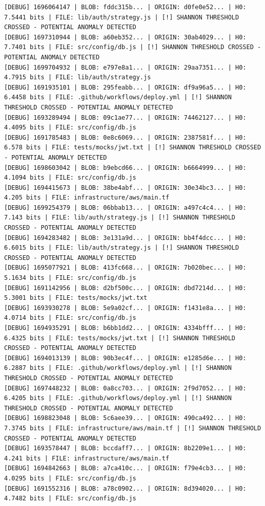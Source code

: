 \documentclass[12pt, a4paper, oneside]{report}
\begin{document}
\begin{lstlisting}[basicstyle=\tiny\ttfamily]
[DEBUG] 1696064147 | BLOB: fddc315b... | ORIGIN: d0fe0e52... | H0: 7.5441 bits | FILE: lib/auth/strategy.js | [!] SHANNON THRESHOLD CROSSED - POTENTIAL ANOMALY DETECTED
[DEBUG] 1697310944 | BLOB: a60eb352... | ORIGIN: 30ab4029... | H0: 7.7401 bits | FILE: src/config/db.js | [!] SHANNON THRESHOLD CROSSED - POTENTIAL ANOMALY DETECTED
[DEBUG] 1699704932 | BLOB: e797e8a1... | ORIGIN: 29aa7351... | H0: 4.7915 bits | FILE: lib/auth/strategy.js
[DEBUG] 1691935101 | BLOB: 295feabb... | ORIGIN: df9a96a5... | H0: 6.4458 bits | FILE: .github/workflows/deploy.yml | [!] SHANNON THRESHOLD CROSSED - POTENTIAL ANOMALY DETECTED
[DEBUG] 1693289494 | BLOB: 09c1ae77... | ORIGIN: 74462127... | H0: 4.4095 bits | FILE: src/config/db.js
[DEBUG] 1691785483 | BLOB: 0e8c6069... | ORIGIN: 2387581f... | H0: 6.578 bits | FILE: tests/mocks/jwt.txt | [!] SHANNON THRESHOLD CROSSED - POTENTIAL ANOMALY DETECTED
[DEBUG] 1698603042 | BLOB: b9ebcd66... | ORIGIN: b6664999... | H0: 4.1094 bits | FILE: src/config/db.js
[DEBUG] 1694415673 | BLOB: 38be4abf... | ORIGIN: 30e34bc3... | H0: 4.205 bits | FILE: infrastructure/aws/main.tf
[DEBUG] 1699254379 | BLOB: 06bbab13... | ORIGIN: a497c4c4... | H0: 7.143 bits | FILE: lib/auth/strategy.js | [!] SHANNON THRESHOLD CROSSED - POTENTIAL ANOMALY DETECTED
[DEBUG] 1694283482 | BLOB: 3e131a9d... | ORIGIN: bb4f4dcc... | H0: 6.6015 bits | FILE: lib/auth/strategy.js | [!] SHANNON THRESHOLD CROSSED - POTENTIAL ANOMALY DETECTED
[DEBUG] 1695077921 | BLOB: 413fc668... | ORIGIN: 7b020bec... | H0: 5.1634 bits | FILE: src/config/db.js
[DEBUG] 1691142956 | BLOB: d2bf500c... | ORIGIN: dbd7214d... | H0: 5.3001 bits | FILE: tests/mocks/jwt.txt
[DEBUG] 1693930278 | BLOB: 5e9a02cf... | ORIGIN: f1431e8a... | H0: 4.0714 bits | FILE: src/config/db.js
[DEBUG] 1694935291 | BLOB: b6bb1dd2... | ORIGIN: 4334bfff... | H0: 6.4325 bits | FILE: tests/mocks/jwt.txt | [!] SHANNON THRESHOLD CROSSED - POTENTIAL ANOMALY DETECTED
[DEBUG] 1694013139 | BLOB: 90b3ec4f... | ORIGIN: e1285d6e... | H0: 6.2887 bits | FILE: .github/workflows/deploy.yml | [!] SHANNON THRESHOLD CROSSED - POTENTIAL ANOMALY DETECTED
[DEBUG] 1697448232 | BLOB: 0a8cc703... | ORIGIN: 2f9d7052... | H0: 6.4205 bits | FILE: .github/workflows/deploy.yml | [!] SHANNON THRESHOLD CROSSED - POTENTIAL ANOMALY DETECTED
[DEBUG] 1698823048 | BLOB: 5c6aee39... | ORIGIN: 490ca492... | H0: 7.3745 bits | FILE: infrastructure/aws/main.tf | [!] SHANNON THRESHOLD CROSSED - POTENTIAL ANOMALY DETECTED
[DEBUG] 1693578447 | BLOB: bccdaff7... | ORIGIN: 8b2209e1... | H0: 4.241 bits | FILE: infrastructure/aws/main.tf
[DEBUG] 1694842663 | BLOB: a7ca410c... | ORIGIN: f79e4cb3... | H0: 4.0295 bits | FILE: src/config/db.js
[DEBUG] 1691552316 | BLOB: a78c0902... | ORIGIN: 8d394020... | H0: 4.7482 bits | FILE: src/config/db.js
\end{lstlisting}
\end{document}
